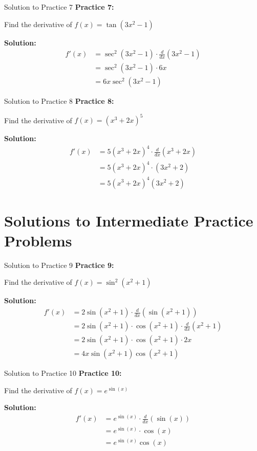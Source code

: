 \documentclass[aspectratio=169]{beamer}
\begin{document}
\begin{frame}{Solution to Practice 7}
\textbf{Practice 7:}

Find the derivative of $f(x) = \tan(3x^2 - 1)$

\textbf{Solution:}
\[
\begin{aligned}
  f'(x) &= \sec^2(3x^2 - 1) \cdot \frac{d}{dx}(3x^2 - 1) \\
  &= \sec^2(3x^2 - 1) \cdot 6x \\
  &= 6x\sec^2(3x^2 - 1)
\end{aligned}
\]
\end{frame}

\begin{frame}{Solution to Practice 8}
\textbf{Practice 8:}

Find the derivative of $f(x) = (x^3 + 2x)^5$

\textbf{Solution:}
\[
\begin{aligned}
  f'(x) &= 5(x^3 + 2x)^4 \cdot \frac{d}{dx}(x^3 + 2x) \\
  &= 5(x^3 + 2x)^4 \cdot (3x^2 + 2) \\
  &= 5(x^3 + 2x)^4(3x^2 + 2)
\end{aligned}
\]
\end{frame}

\section{Solutions to Intermediate Practice Problems}

\begin{frame}{Solution to Practice 9}
\textbf{Practice 9:}

Find the derivative of $f(x) = \sin^2(x^2 + 1)$

\textbf{Solution:}
\[
\begin{aligned}
  f'(x) &= 2\sin(x^2 + 1) \cdot \frac{d}{dx}(\sin(x^2 + 1)) \\
  &= 2\sin(x^2 + 1) \cdot \cos(x^2 + 1) \cdot \frac{d}{dx}(x^2 + 1) \\
  &= 2\sin(x^2 + 1) \cdot \cos(x^2 + 1) \cdot 2x \\
  &= 4x\sin(x^2 + 1)\cos(x^2 + 1)
\end{aligned}
\]
\end{frame}

\begin{frame}{Solution to Practice 10}
\textbf{Practice 10:}

Find the derivative of $f(x) = e^{\sin(x)}$

\textbf{Solution:}
\[
\begin{aligned}
  f'(x) &= e^{\sin(x)} \cdot \frac{d}{dx}(\sin(x)) \\
  &= e^{\sin(x)} \cdot \cos(x) \\
  &= e^{\sin(x)}\cos(x)
\end{aligned}
\]
\end{frame}
\end{document}
